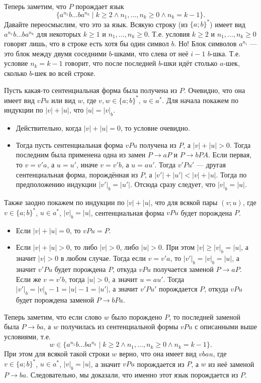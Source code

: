 \documentclass[12pt,a4paper]{article}
\begin{document}
\begin{problem}{3}
\begin{enumerate}
                Теперь заметим, что $P$ порождает язык
                \[\{a^{n_1} b \dots b a^{n_k} \mid k \geqslant 2 \wedge n_1, \dots, n_k \geqslant 0 \wedge n_k = k-1\}.\]
                Давайте переосмыслим, что это за язык. Всякую строку (из $\{a; b\}^*$) имеет вид $a^{n_1} b \dots b a^{n_k}$ для некоторых $k \geqslant 1$ и $n_1, \dots, n_k \geqslant 0$. Т.е. условия $k \geqslant 2$ и $n_1, \dots, n_k \geqslant 0$ говорят лишь, что в строке есть хотя бы один символ $b$. Но! Блок символов $a^{n_i}$ --- это блок между двумя соседними $b$-шками, что слева от неё $i-1$ $b$-шка. Т.е. условие $n_k = k-1$ говорит, что после последней $b$-шки идёт столько $a$-шек, сколько $b$-шек во всей строке.
                
                Пусть какая-то сентенциальная форма была получена из $P$. Очевидно, что она имеет вид $vPu$ или вид $w$, где $v, w \in \{a; b\}^*$, $u \in a^*$. Для начала покажем по индукции по $|v| + |u|$, что $|u|=|v|_b$.
                \begin{itemize}
                    \item Действительно, когда $|v| + |u| = 0$, то условие очевидно.
                    \item Тогда пусть сентенциальная форма $vPu$ получена из $P$, а $|v| + |u| > 0$. Тогда последним была применена одна из замен $P \to aP$ и $P \to bPA$. Если первая, то $v = v' a$, а $u = u'$, иначе $v = v' b$, а $u = a u'$. Тогда $v' P u'$ --- другая сентенциальная форма, порождённая из $P$, а $|v'| + |u'| < |v| + |u|$. Тогда по предположению индукции $|v'|_b = |u'|$. Отсюда сразу следует, что $|v|_b = |u|$.
                \end{itemize}
                Также заодно покажем по индукции по $|v| + |u|$, что для всякой пары $(v; u)$, где $v \in \{a; b\}^*$, $u \in a^*$, $|v|_b = |u|$, сентенциальная форма $vPu$ будет порождена $P$.
                \begin{itemize}
                    \item Если $|v| + |u| = 0$, то $vPu = P$.
                    \item Если $|v| + |u| > 0$, то либо $|v| > 0$, либо $|u| > 0$. При этом $|v| \geqslant |v|_b = |u|$, а значит $|v| > 0$ в любом случае. Тогда если $v = v' a$, то $|v'|_b = |v|_b = |u|$, а значит $v' P u$ будет порождена $P$, откуда $vPu$ получается заменой $P \to aP$. Если же $v = v'b$, тогда $|u| > 0$, а значит $u = a u'$. Тогда $|v'|_b = |v|_b - 1 = |u| - 1 = |u'|$, а значит $v'Pu'$ порождается $P$, откуда $vPu$ будет порождена заменой $P \to bPa$. 
                \end{itemize}
                Теперь заметим, что если слово $w$ было порождено $P$, то последней заменой была $P \to ba$, а $w$ получилась из сентенциальной формы $vPu$ с описанными выше условиями, т.е.
                \[w \in \{a^{n_1} b \dots b a^{n_k} \mid k \geqslant 2 \wedge n_1, \dots, n_k \geqslant 0 \wedge n_k = k-1\}.\]
                При этом для всякой такой строки $w$ верно, что она имеет вид $vbau$, где $v \in \{a; b\}^*$, $u \in a^*$, $|v|_b = |u|$, а значит $vPu$ порождается из $P$, а $w$ из неё заменой $P \to ba$. Следовательно, мы доказали, что именно этот язык порождается из $P$.


\end{enumerate}
\end{problem}
\end{document}
